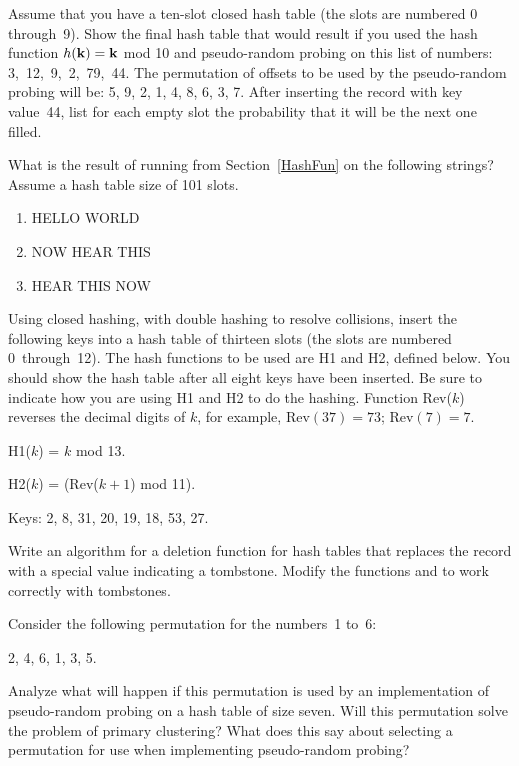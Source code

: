 \begin{exercises}
\item
Assume that you have a ten-slot closed hash table
(the slots are numbered 0 through~9).
Show the final hash table that would result if you used
the hash function \(h({\bf k}) = {\bf k}\) mod 10 and pseudo-random probing
on this list of numbers: 3,~12,~9,~2,~79,~44.
The permutation of offsets to be used by the pseudo-random probing
will be: 5, 9, 2, 1, 4, 8, 6, 3, 7.
After inserting the record with key value~44, list for each empty slot
the probability that it will be the next one filled.

\item
What is the result of running  from Section~\ref{HashFun}
on the following strings?
Assume a hash table size of 101 slots.

\begin{enumerate}
\item HELLO WORLD
\item NOW HEAR THIS
\item HEAR THIS NOW
\end{enumerate}

\item
Using closed hashing, with
double hashing to resolve collisions,
insert the following keys into a hash table of thirteen
slots (the slots are numbered 0~through~12).
The hash functions to be used are H1 and H2, defined below.
You should show the hash table after all eight keys have been
inserted.
Be sure to indicate how you are using H1 and H2 to do the hashing.
Function Rev(\(k\)) reverses the decimal digits of \(k\), for example,
Rev\((37) = 73\); Rev\((7) = 7\).

\medskip

H1(\(k\)) = \(k\) mod 13.

H2(\(k\)) = (Rev(\(k + 1\)) mod 11).

\medskip

Keys: 2,  8,  31, 20, 19, 18, 53, 27.

\item
Write an algorithm for a deletion function for hash
tables that
replaces the record with a special value indicating a tombstone.
Modify the functions  and  to work
correctly with tombstones.

\item
Consider the following permutation for the numbers~1 to~6:

\begin{center}
2, 4, 6, 1, 3, 5.
\end{center}

\noindent Analyze what will happen if this permutation is used by an
implementation of pseudo-random probing on a hash table of size seven.
Will this permutation solve the problem of primary clustering?
What does this say about selecting a permutation for use when
implementing pseudo-random probing?

\end{exercises}

